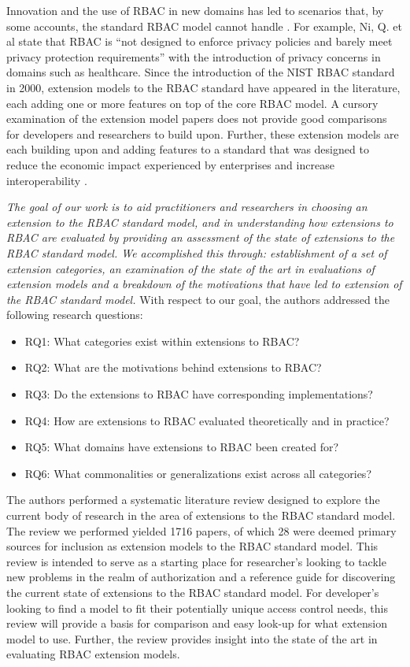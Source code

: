 Innovation and the use of RBAC in new domains has led to scenarios that, by some accounts, the standard RBAC model cannot handle \cite{kuhn2010adding}.  
For example, Ni, Q. et al \cite{ni2010privacy} state that RBAC is ``not designed to enforce privacy policies and barely 
meet privacy protection requirements'' with the introduction of privacy concerns in domains such as healthcare. 
Since the introduction of the NIST RBAC standard in 2000, extension models to the RBAC standard have appeared in the literature, each adding one or more features on top of the core RBAC model. 
A cursory examination of the extension model papers does not provide good comparisons for developers and researchers to build upon. 
Further, these extension models are each building upon and adding features to a standard that was designed to reduce the economic impact experienced by enterprises and increase interoperability \cite{o20102010}.

\textit{The goal of our work is to aid practitioners and researchers in choosing an extension to the RBAC standard model, and in understanding
how extensions to RBAC are evaluated by providing an assessment of the state of extensions to the RBAC standard model. We accomplished this through: 
establishment of a set of extension categories, an examination of the state of the art in evaluations of extension models and a breakdown of the 
motivations that have led to extension of the RBAC standard model.} With respect to our goal, the authors addressed the following research questions:

\begin{itemize}
\setlength{\itemsep}{0.25pt}
\item RQ1: What categories exist within extensions to RBAC?
\item RQ2: What are the motivations behind extensions to RBAC?
\item RQ3: Do the extensions to RBAC have corresponding implementations?
\item RQ4: How are extensions to RBAC evaluated theoretically and in practice?
\item RQ5: What domains have extensions to RBAC been created for?
\item RQ6: What commonalities or generalizations exist across all categories?
\end{itemize}

The authors performed a systematic literature review designed to explore the current body of research in the area of extensions to the RBAC standard model. 
The review we performed yielded 1716 papers, of which 28 were deemed primary sources for inclusion as extension models to the RBAC standard model.  
This review is intended to serve as a starting place for researcher's looking to tackle new problems in the realm of authorization and a reference guide for discovering
the current state of extensions to the RBAC standard model. 
For developer's looking to find a model to fit their potentially unique access control needs, this review will provide a basis for comparison and easy look-up for what extension model to use.  
Further, the review provides insight into the state of the art in evaluating RBAC extension models.

